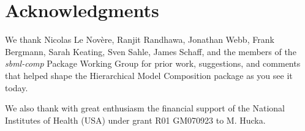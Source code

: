 
\section{Acknowledgments}

We thank Nicolas Le Nov\`{e}re, Ranjit Randhawa, Jonathan Webb, Frank
Bergmann, Sarah Keating, Sven Sahle, James Schaff, and the members of
the \emph{sbml-comp} Package Working Group for prior work, suggestions,
and comments that helped shape the Hierarchical Model Composition
package as you see it today.

We also thank with great enthusiasm the financial support of the National
Institutes of Health (USA) under grant R01 GM070923 to M. Hucka.
